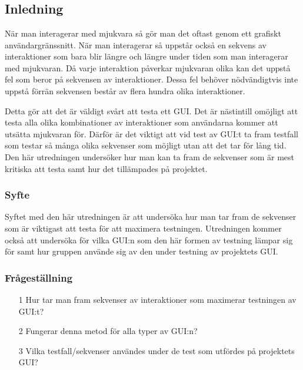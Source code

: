 \chapter{}
\label{cha:indiv-report-holmberg}

\section{Inledning}
\label{sec:introduction-holmberg}

När man interagerar med mjukvara så gör man det oftast genom ett grafiskt användargränssnitt. När man interagerar så uppstår också en sekvens av interaktioner som bara blir längre och längre under tiden som man interagerar med mjukvaran. Då varje interaktion påverkar mjukvaran olika kan det uppstå fel som beror på sekvensen av interaktioner. Dessa fel behöver nödvändigtvis inte uppstå förrän sekvensen består av flera hundra olika interaktioner.

Detta gör att det är väldigt svårt att testa ett GUI. Det är nästintill omöjligt att testa alla olika kombinationer av interaktioner som användarna kommer att utsätta mjukvaran för. Därför är det viktigt att vid test av GUI:t ta fram testfall som testar så många olika sekvenser som möjligt utan att det tar för lång tid. Den här utredningen undersöker hur man kan ta fram de sekvenser som är mest kritiska att testa samt hur det tillämpades på projektet.

\subsection{Syfte}
\label{sec:purpose-holmberg}

Syftet med den här utredningen är att undersöka hur man tar fram de sekvenser som är viktigast att testa för att maximera testningen. Utredningen kommer också att undersöka för vilka GUI:n som den här formen av testning lämpar sig för samt hur gruppen använde sig av den under testning av projektets GUI.

\subsection{Frågeställning}
\label{sec:issue-holmberg}

\begin{itemize}
	\item [1] Hur tar man fram sekvenser av interaktioner som maximerar testningen av GUI:t?
	\item [2] Fungerar denna metod för alla typer av GUI:n? 
	\item [3] Vilka testfall/sekvenser användes under de test som utfördes på projektets GUI?
\end{itemize}

